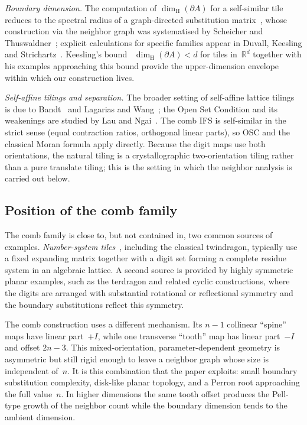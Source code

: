 \documentclass{amsart}
\theoremstyle{definition}
\theoremstyle{remark}
\newcommand{\R}{\mathbb{R}}
\newcommand{\dH}{\dim_{\mathrm{H}}}
\begin{document}
\emph{Boundary dimension.}
The computation of $\dH(\partial A)$ for a self-similar tile reduces
to the spectral radius of a graph-directed substitution
matrix~\cite{mauldin-williams}, whose construction via the neighbor
graph was systematised by Scheicher and
Thuswaldner~\cite{scheicher-thuswaldner}; explicit calculations for
specific families appear in Duvall, Keesling and
Strichartz~\cite{duvall-keesling-strichartz}.  Keesling's
bound~\cite{keesling} $\dH(\partial A) < d$ for tiles in~$\R^d$
together with his examples approaching this bound provide the
upper-dimension envelope within which our construction lives.

\emph{Self-affine tilings and separation.}
The broader setting of self-affine lattice tilings is due to
Bandt~\cite{bandt1991} and Lagarias and Wang~\cite{lagarias-wang};
the Open Set Condition and its weakenings are studied by Lau and
Ngai~\cite{lau-ngai}.  The comb IFS is self-similar in the strict
sense (equal contraction ratios, orthogonal linear parts), so OSC and
the classical Moran formula apply directly.  Because the digit maps use
both orientations, the natural tiling is a crystallographic
two-orientation tiling rather than a pure translate tiling; this is the
setting in which the neighbor analysis is carried out below.

\subsection*{Position of the comb family}

The comb family is close to, but not contained in, two common sources of
examples.  \emph{Number-system tiles}~\cite{akiyama-thuswaldner,
lagarias-wang}, including the classical twindragon, typically use a fixed
expanding matrix together with a digit set forming a complete residue
system in an algebraic lattice.  A second source is provided by highly
symmetric planar examples, such as the terdragon and related cyclic
constructions, where the digits are arranged with substantial rotational
or reflectional symmetry and the boundary substitutions reflect this
symmetry.

The comb construction uses a different mechanism.  Its $n{-}1$
collinear ``spine'' maps have linear part~$+I$, while one transverse
``tooth'' map has linear part~$-I$ and offset $2n{-}3$.  This
mixed-orientation, parameter-dependent geometry is asymmetric but still
rigid enough to leave a neighbor graph whose size is independent of~$n$.
It is this combination that the paper exploits: small boundary
substitution complexity, disk-like planar topology, and a Perron root
approaching the full value~$n$.  In higher dimensions the same tooth
offset produces the Pell-type growth of the neighbor count while the
boundary dimension tends to the ambient dimension.
\end{document}
